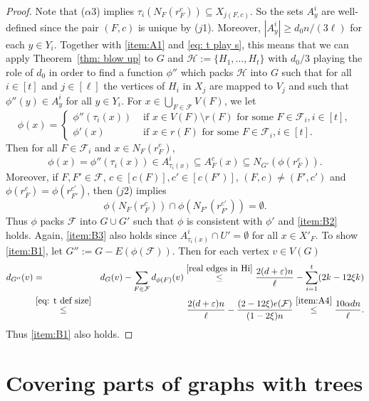 \documentclass[a4paper, 11pt, reqno]{amsart}
\numberwithin{equation}{section}
\newcommand{\1}{{\rm 1\hspace*{-0.4ex}%
\rule{0.1ex}{1.52ex}\hspace*{0.2ex}}}
\newcommand{\cF}{\mathcal{F}}
\newcommand{\cH}{\mathcal{H}}
\renewcommand{\epsilon}{\varepsilon}
\begin{document}
\begin{proof}
Note that ($\alpha$3) implies $\tau_{i}(N_{F}(r^c_F))\subseteq X_{j(F,c)}$. So the sets $A^i_y$ are well-defined since the pair $(F,c)$ is unique by ($j$1). Moreover, $|A^i_{y}|\geq d_0n/(3\ell)$ for each $y\in Y_i$. Together with \ref{item:A1} and \eqref{eq: t play s},
this means that we can apply Theorem~\ref{thm: blow up} to $G$ and $\cH:= \{ H_1,\dots, H_t\}$ with $d_0/3$ playing the role of $d_0$ in order to find a function $\phi''$ which packs $\cH$ into $G$ such that for all $i\in [t]$ and $j\in [\ell]$ the vertices of $H_i$ in $X_j$ are mapped to $V_j$ and such that $\phi''(y) \in A^i_y$ for all $y\in Y_i$. 
For $x\in \bigcup_{F\in \cF} V(F)$, we let 
$$\phi(x) = \left\{\begin{array}{ll} \phi''(\tau_i(x)) & \text{ if } x\in V(F)\setminus r(F) \text{ for some }F\in \cF_i, i\in [t],\\
 \phi'(x) & \text{ if } x\in r(F) \text{ for some }F\in \cF_i, i\in [t].\end{array}\right.$$
 Then for all $F\in \cF_i$ and $x\in N_F(r^c_F)$,
 $$\phi(x)= \phi''( \tau_{i}(x)) \in A^i_{\tau_i(x)} \subseteq A^c_F(x)\subseteq N_{G'}(\phi(r^c_F)).$$  
 Moreover, if $F,F'\in \cF$, $c\in [c(F)], c'\in [c(F')]$, $(F,c)\neq (F',c')$ and $\phi(r^c_F)=\phi(r^{c'}_{F'})$, then ($j$2) implies
 $$\phi(N_{F}(r^c_F) )\cap \phi(N_{F'}(r^{c'}_{F'}))= \emptyset.$$  Thus $\phi$ packs $\cF$ into $G\cup G'$ such that $\phi$ is consistent with $\phi'$ and \ref{item:B2} holds. Again, \ref{item:B3} also holds since $A^i_{\tau_i(x)} \cap U'=\emptyset$ for all $x\in X'_F$. 
 To show \ref{item:B1}, let $G'':=G-E(\phi(\cF))$. 
Then for each vertex $v\in V(G)$ 
\begin{eqnarray*}
d_{G''}(v) 
&=& d_{G}(v) - \sum_{F\in \cF} d_{\phi(F)}(v) \stackrel{\eqref{real edges in Hi}}{\leq} \frac{2(d+\epsilon)n}{\ell} - \sum_{i=1}^{t} (2k-12\xi k) \\ 
&\stackrel{\eqref{eq: t def size}}{\leq}& \frac{2(d+\epsilon)n}{\ell} - \frac{(2-12\xi)e(\cF)}{(1-2\xi)n}
 \stackrel{\ref{item:A4}}{\leq} \frac{10\alpha dn}{\ell}.
\end{eqnarray*}
Thus \ref{item:B1} also holds.
\end{proof}





\section{Covering parts of graphs with trees}\label{sec:cleaning}
\end{document}
